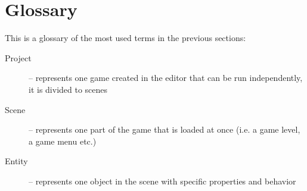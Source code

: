\section{Glossary}
This is a glossary of the most used terms in the previous sections:

\begin{description}
  \item[Project] -- represents one game created in the editor that can be run independently, it is divided to scenes
  \item[Scene] -- represents one part of the game that is loaded at once (i.e. a game level, a game menu etc.)
  \item[Entity] -- represents one object in the scene with specific properties and behavior
\end{description}